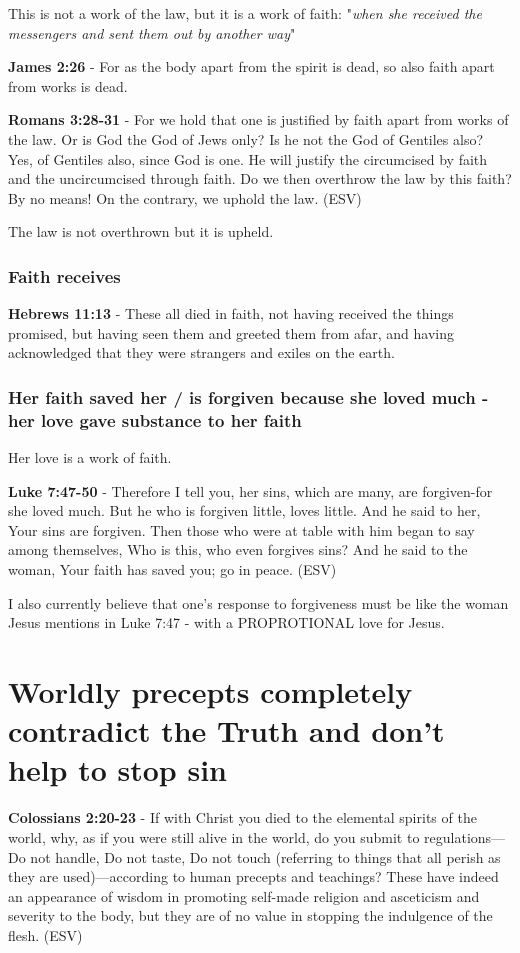 \documentclass[11pt]{article}
\begin{document}
This is not a work of the law, but it is a work of faith: "\emph{when she received the messengers and sent them out by another way}"

\textbf{James 2:26} - For as the body apart from the spirit is dead, so also faith apart from works is dead.

\textbf{Romans 3:28-31} - For we hold that one is justified by faith apart from works of the law. Or is God the God of Jews only? Is he not the God of Gentiles also? Yes, of Gentiles also, since God is one. He will justify the circumcised by faith and the uncircumcised through faith. Do we then overthrow the law by this faith? By no means! On the contrary, we uphold the law. (ESV)

The law is not overthrown but it is upheld.

\subsubsection{Faith receives}
\label{sec:orgb26d67c}
\textbf{Hebrews 11:13} - These all died in faith, not having received the things promised, but having seen them and greeted them from afar, and having acknowledged that they were strangers and exiles on the earth.

\subsubsection{Her faith saved her / is forgiven because she loved much - her love gave substance to her faith}
\label{sec:org629c832}
Her love is a work of faith.

\textbf{Luke 7:47-50} - Therefore I tell you, her sins, which are many, are forgiven-for she loved much. But he who is forgiven little, loves little. And he said to her, Your sins are forgiven. Then those who were at table with him began to say among themselves, Who is this, who even forgives sins? And he said to the woman, Your faith has saved you; go in peace. (ESV)

I also currently believe that one's response to forgiveness must be like the woman Jesus mentions in Luke 7:47 - with a PROPROTIONAL love for Jesus.

\section{Worldly precepts completely contradict the Truth and don't help to stop sin}
\label{sec:org6ec8094}
\textbf{Colossians 2:20-23} - If with Christ you died to the elemental spirits of the world, why, as if you were still alive in the world, do you submit to regulations— Do not handle, Do not taste, Do not touch (referring to things that all perish as they are used)—according to human precepts and teachings? These have indeed an appearance of wisdom in promoting self-made religion and asceticism and severity to the body, but they are of no value in stopping the indulgence of the flesh. (ESV)
\end{document}
